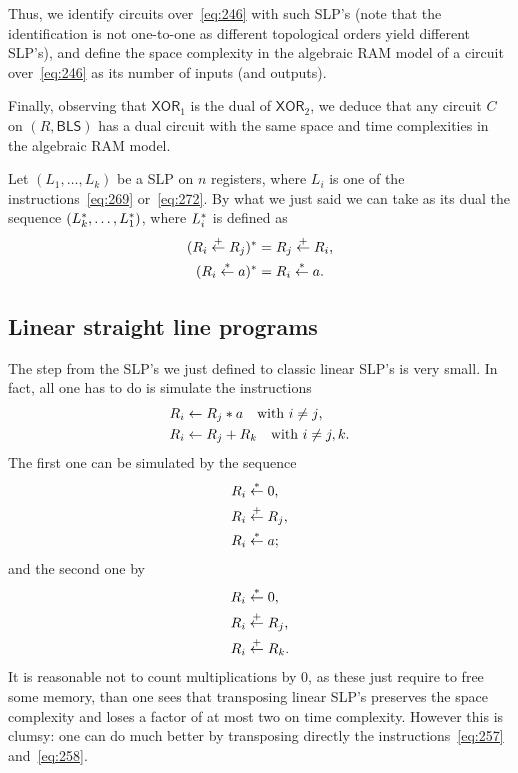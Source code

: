   Thus,
we identify circuits over~\ref{eq:246} with such SLP's (note that the
identification is not one-to-one as different topological orders yield
different SLP's), and define the space complexity in the algebraic RAM
model of a circuit over~\ref{eq:246} as its number of inputs (and
outputs).

Finally, observing that $\mathsf{XOR}_1$ is the dual of
$\mathsf{XOR}_2$, we deduce that any circuit $C$ on $(R,\mathsf{BLS})$
has a dual circuit with the same space and time complexities in the
algebraic RAM model.


\begin{remark}
  Let $(L_1,\ldots,L_k)$ be a SLP on $n$ registers, where $L_i$ is one
  of the instructions~\eqref{eq:269} or~\eqref{eq:272}. By what we
  just said we can take as its dual the sequence
  $(L_k^\ast,\ldots,L_1^\ast)$, where $L_i^\ast$ is defined as
  \begin{align}
    \label{eq:273}
    (R_i\overset{+}{\leftarrow}R_j)^\ast &= R_j\overset{+}{\leftarrow}R_i\text{,}\\
    (R_i\overset{*}{\leftarrow}a)^\ast &= R_i\overset{*}{\leftarrow}a\text{.}
  \end{align}
\end{remark}


\subsection{Linear straight line programs}
\label{sec:gener-stra-line}
The step from the SLP's we just defined to classic linear SLP's is
very small. In fact, all one has to do is simulate the instructions
\begin{align}
  \label{eq:257}
  R_i &\leftarrow R_j*a\quad\text{with $i\ne j$,}\\
  \label{eq:258}
  R_i &\leftarrow R_j + R_k\quad\text{with $i\ne j,k$.}
\end{align}
The first one can be simulated by the sequence
\begin{equation}
  \label{eq:259}
  \begin{aligned}
    R_i &\overset{*}{\leftarrow} 0\text{,}\\
    R_i &\overset{+}{\leftarrow} R_j\text{,}\\
    R_i &\overset{*}{\leftarrow} a\text{;}
  \end{aligned}
\end{equation}
and the second one by
\begin{equation}
  \label{eq:260}
  \begin{aligned}
    R_i &\overset{*}{\leftarrow} 0\text{,}\\
    R_i &\overset{+}{\leftarrow} R_j\text{,}\\
    R_i &\overset{+}{\leftarrow} R_k\text{.}
  \end{aligned}
\end{equation}
It is reasonable not to count multiplications by $0$, as these just
require to free some memory, than one sees that transposing linear
SLP's preserves the space complexity and loses a factor of at most two
on time complexity. However this is clumsy: one can do much better by
transposing directly the instructions~\eqref{eq:257}
and~\eqref{eq:258}.


